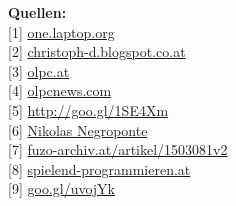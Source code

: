 \textbf{Quellen:} \\
{[}1{]} \href{http://one.laptop.org/}{one.laptop.org} \\
{[}2{]} \href{http://christoph-d.blogspot.co.at/}{christoph-d.blogspot.co.at} \\
{[}3{]} \href{http://olpc.at}{olpc.at} \\
{[}4{]} \href{http://www.olpcnews.com/}{olpcnews.com} \\
{[}5{]} \href{https://en.wikipedia.org/wiki/Sugar_(desktop_environment)}{http://goo.gl/1SE4Xm} \\
{[}6{]} \href{https://de.wikipedia.org/wiki/Nicholas_Negroponte}{Nikolas Negroponte} \\
{[}7{]} \href{http://www.fuzo-archiv.at/artikel/1503081v2}{fuzo-archiv.at/artikel/1503081v2} \\
{[}8{]} \href{http://spielend-programmieren.at}{spielend-programmieren.at} \\
{[}9{]} \href{http://www.olpcnews.com/commentary/olpc_news/happy_new_year_from_olpc_news.html}{goo.gl/uvojYk}
